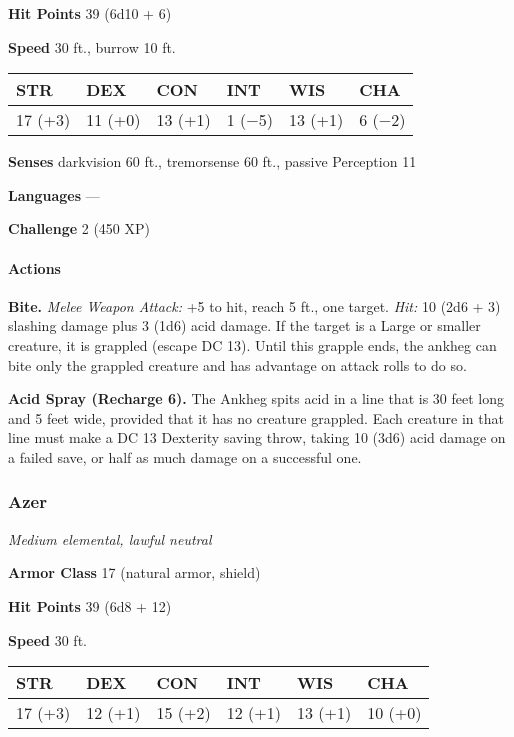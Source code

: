 \documentclass[
]{article}
\begin{document}
\textbf{Hit Points} 39 (6d10 + 6)

\textbf{Speed} 30 ft., burrow 10 ft.

\begin{longtable}[]{@{}llllll@{}}
\toprule
STR & DEX & CON & INT & WIS & CHA\tabularnewline
\midrule
\endhead
17 (+3) & 11 (+0) & 13 (+1) & 1 (−5) & 13 (+1) & 6 (−2)\tabularnewline
\bottomrule
\end{longtable}

\textbf{Senses} darkvision 60 ft., tremorsense 60 ft., passive
Perception 11

\textbf{Languages} ---

\textbf{Challenge} 2 (450 XP)

\hypertarget{actions-7}{%
\paragraph{Actions}\label{actions-7}}

\textbf{Bite.} \emph{Melee Weapon Attack:} +5 to hit, reach 5 ft., one
target. \emph{Hit:} 10 (2d6 + 3) slashing damage plus 3 (1d6) acid
damage. If the target is a Large or smaller creature, it is grappled
(escape DC 13). Until this grapple ends, the ankheg can bite only the
grappled creature and has advantage on attack rolls to do so.

\textbf{Acid Spray (Recharge 6).} The Ankheg spits acid in a line that
is 30 feet long and 5 feet wide, provided that it has no creature
grappled. Each creature in that line must make a DC 13 Dexterity saving
throw, taking 10 (3d6) acid damage on a failed save, or half as much
damage on a successful one.

\hypertarget{azer}{%
\subsubsection{Azer}\label{azer}}

\emph{Medium elemental, lawful neutral}

\textbf{Armor Class} 17 (natural armor, shield)

\textbf{Hit Points} 39 (6d8 + 12)

\textbf{Speed} 30 ft.

\begin{longtable}[]{@{}llllll@{}}
\toprule
STR & DEX & CON & INT & WIS & CHA\tabularnewline
\midrule
\endhead
17 (+3) & 12 (+1) & 15 (+2) & 12 (+1) & 13 (+1) & 10 (+0)\tabularnewline
\bottomrule
\end{longtable}
\end{document}
